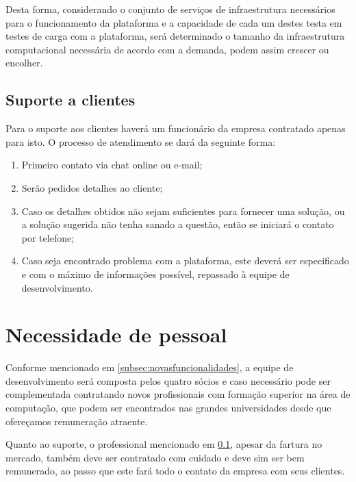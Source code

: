   Desta forma, considerando o conjunto de serviços de infraestrutura necessários para o funcionamento da plataforma e a capacidade de cada um destes testa em testes de carga com a plataforma, será determinado o tamanho da infraestrutura computacional necessária de acordo com a demanda, podem assim crescer ou encolher.
  
  \subsection{Suporte a clientes}\label{subsec:suporte}
  Para o suporte aos clientes haverá um funcionário da empresa contratado apenas para isto. O processo de atendimento se dará da seguinte forma:
  
  \begin{enumerate}
    \item Primeiro contato via chat online ou e-mail;
    \item Serão pedidos detalhes ao cliente;
    \item Caso os detalhes obtidos não sejam suficientes para fornecer uma solução, ou a solução sugerida não tenha sanado a questão, então se iniciará o contato por telefone;
    \item Caso seja encontrado problema com a plataforma, este deverá ser especificado e com o máximo de informações possível, repassado à equipe de desenvolvimento.
  \end{enumerate}
  
\section{Necessidade de pessoal}
Conforme mencionado em \ref{subsec:novasfuncionalidades}, a equipe de desenvolvimento será composta pelos quatro sócios e caso necessário pode ser complementada contratando novos profissionais com formação superior na área de computação, que podem ser encontrados nas grandes universidades desde que ofereçamos remuneração atraente.

Quanto ao suporte, o professional mencionado em \ref{subsec:suporte}, apesar da fartura no mercado, também deve ser contratado com cuidado e deve sim ser bem remunerado, ao passo que este fará todo o contato da empresa com seus clientes.
